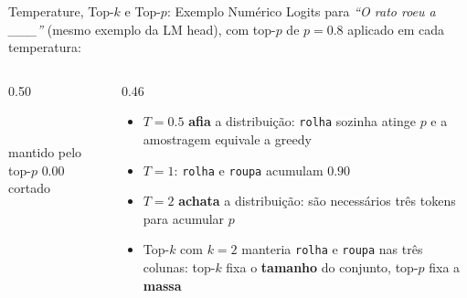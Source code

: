 \documentclass[aspectratio=169, xcolor=dvipsnames]{beamer}
\begin{document}
  \begin{frame}{Temperature, Top-$k$ e Top-$p$: Exemplo Numérico}
    Logits para \textit{``O rato roeu a \_\_\_''} (mesmo exemplo da LM head), com top-$p$ de $p = 0.8$ aplicado em cada temperatura:
    \vspace{0.4em}
    \begin{columns}[T]
      \begin{column}{0.50\textwidth}
        \centering
        \renewcommand{\arraystretch}{1.1}

        \vspace{0.4em}
        {\scriptsize \colorbox{CellGreen}{\strut\ \ } mantido pelo top-$p$\qquad
        \textcolor{MidGray}{0.00} cortado}
      \end{column}
      \begin{column}{0.46\textwidth}
        \begin{itemize}
          \item $T{=}0.5$ \textbf{afia} a distribuição: \texttt{rolha} sozinha atinge $p$ e a amostragem equivale a greedy
          \item $T{=}1$: \texttt{rolha} e \texttt{roupa} acumulam $0.90$
          \item $T{=}2$ \textbf{achata} a distribuição: são necessários três tokens para acumular $p$
          \item Top-$k$ com $k{=}2$ manteria \texttt{rolha} e \texttt{roupa} nas três colunas: top-$k$ fixa o \textbf{tamanho} do conjunto, top-$p$ fixa a \textbf{massa}
        \end{itemize}
      \end{column}
    \end{columns}
  \end{frame}
\end{document}
